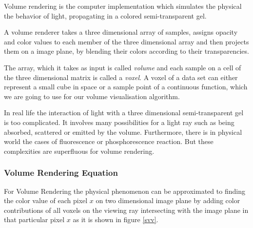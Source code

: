 \documentclass[a4paper,12pt]{article}
\begin{document}
Volume rendering is the computer implementation which simulates the physical
the behavior of light, propagating in a colored semi-transparent gel.

A volume renderer takes a three dimensional array of samples, assigns
opacity and color values to each member of the three dimensional array
and then projects them on a image plane, by blending their colors
according to their transparencies.

The array, which it takes as input is called \emph{volume} and each
sample on a cell of the three dimensional matrix is called a
\emph{voxel}. A voxel of a data set can either represent a small cube
in space or a sample point of a continuous function, which we are going to use
for our volume visualisation algorithm.

In real life the interaction of light with a three dimensional
semi-transparent gel is too complicated. It involves many
possibilities for a light ray such as being absorbed, scattered or
emitted by the volume.  Furthermore, there is in physical world the
cases of fluorescence or phosphorescence reaction. But these
complexities are superfluous for volume rendering.

\subsubsection{Volume Rendering Equation}

For Volume Rendering the physical phenomenon can be approximated to
finding the color value of each pixel $x$ on two dimensional image
plane by adding color contributions of all voxels on the viewing
ray intersecting with the image plane in that particular pixel $x$ as
it is shown in figure \ref{svv}.
\end{document}
